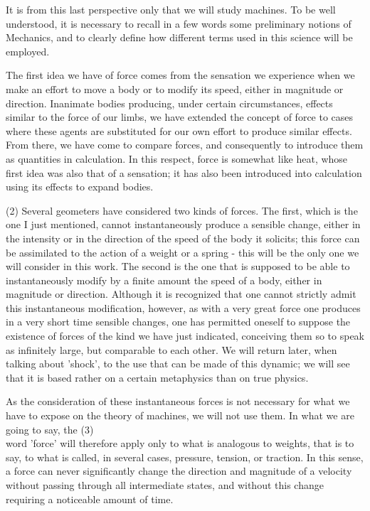 \documentclass{book}
\begin{document}
It is from this last perspective only that we will study machines. To be well understood, it is necessary to recall in a few words some preliminary notions of Mechanics, and to clearly define how different terms used in this science will be employed.

The first idea we have of force comes from the sensation we experience when we make an effort to move a body or to modify its speed, either in magnitude or direction. Inanimate bodies producing, under certain circumstances, effects similar to the force of our limbs, we have extended the concept of force to cases where these agents are substituted for our own effort to produce similar effects. From there, we have come to compare forces, and consequently to introduce them as quantities in calculation. In this respect, force is somewhat like heat, whose first idea was also that of a sensation; it has also been introduced into calculation using its effects to expand bodies.

(2) Several geometers have considered two kinds of forces. The first, which is the one I just mentioned, cannot instantaneously produce a sensible change, either in the intensity or in the direction of the speed of the body it solicits; this force can be assimilated to the action of a weight or a spring - this will be the only one we will consider in this work. The second is the one that is supposed to be able to instantaneously modify by a finite amount the speed of a body, either in magnitude or direction. Although it is recognized that one cannot strictly admit this instantaneous modification, however, as with a very great force one produces in a very short time sensible changes, one has permitted oneself to suppose the existence of forces of the kind we have just indicated, conceiving them so to speak as infinitely large, but comparable to each other. We will return later, when talking about 'shock', to the use that can be made of this dynamic; we will see that it is based rather on a certain metaphysics than on true physics.

As the consideration of these instantaneous forces is not necessary for what we have to expose on the theory of machines, we will not use them. In what we are going to say, the
\newpage
(3)
\\
word 'force' will therefore apply only to what is analogous to weights, that is to say, to what is called, in several cases, pressure, tension, or traction.
In this sense, a force can never significantly change the direction and magnitude of a velocity without passing through all intermediate states, and without this change requiring a noticeable amount of time.
\end{document}
